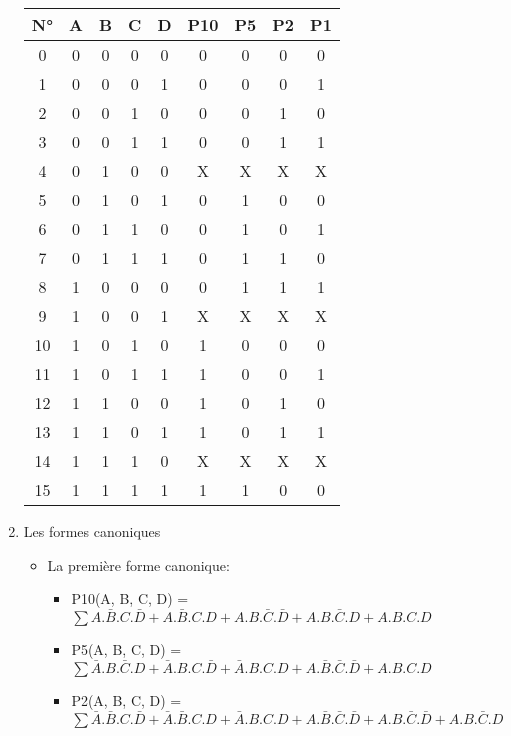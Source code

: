 \begin{enumerate}
\begin{tabular}{|c|c|c|c|c||c|c|c|c|}
        N° &A & B & C & D & P10 & P5 & P2 & P1\\ \midrule
0 & 0 & 0 & 0 & 0 & 0 & 0 & 0 & 0\\
1 & 0 & 0 & 0 & 1 & 0 & 0 & 0 & 1\\
2 & 0 & 0 & 1 & 0 & 0 & 0 & 1 & 0\\
3 & 0 & 0 & 1 & 1 & 0 & 0 & 1 & 1\\
\midrule
4 & 0 & 1 & 0 & 0 & X & X & X & X\\
5 & 0 & 1 & 0 & 1 & 0 & 1 & 0 & 0\\
6 & 0 & 1 & 1 & 0 & 0 & 1 & 0 & 1\\
7 & 0 & 1 & 1 & 1 & 0 & 1 & 1 & 0\\
\midrule
8 & 1 & 0 & 0 & 0 & 0 & 1 & 1 & 1\\
9 & 1 & 0 & 0 & 1 & X & X & X & X\\
10 & 1 & 0 & 1 & 0 & 1 & 0 & 0 & 0\\
11 & 1 & 0 & 1 & 1 & 1 & 0 & 0 & 1\\
\midrule
12 & 1 & 1 & 0 & 0 & 1 & 0 & 1 & 0\\
13 & 1 & 1 & 0 & 1 & 1 & 0 & 1 & 1\\
14 & 1 & 1 & 1 & 0 & X & X & X & X\\
15 & 1 & 1 & 1 & 1 & 1 & 1 & 0 & 0\\
\bottomrule

        \end{tabular}


        
\item Les formes canoniques 

\begin{itemize}
\item La première forme canonique:  



\begin{itemize}
\item P10(A, B, C, D) = $\sum A.\bar B.C.\bar D + A.\bar B.C.D + A.B.\bar C.\bar D + A.B.\bar C.D + A.B.C.D$ 


\item P5(A, B, C, D) = $\sum \bar A.B.\bar C.D + \bar A.B.C.\bar D + \bar A.B.C.D + A.\bar B.\bar C.\bar D + A.B.C.D$ 


\item P2(A, B, C, D) = $\sum \bar A.\bar B.C.\bar D + \bar A.\bar B.C.D + \bar A.B.C.D + A.\bar B.\bar C.\bar D + A.B.\bar C.\bar D + A.B.\bar C.D$ 



\end{itemize}
\end{itemize}
\end{enumerate}
